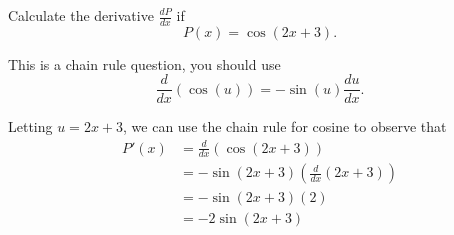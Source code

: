 \documentclass{ximera}
\author{Emma Smith Zbarsky}
\begin{document}
\begin{exercise}

Calculate the derivative $\frac{dP}{dx}$ if \[P(x) = \cos(2x+3).\]


\begin{hint}
This is a chain rule question, you should use
\[\frac{d}{dx}\left(\cos(u)\right) = -\sin(u)\frac{du}{dx}.\]
\end{hint}


\begin{hint}
Letting $u = 2x+3$, we can use the chain rule for cosine to observe that
\begin{align*}
P'(x) &= \frac{d}{dx}\left(\cos(2x+3)\right) \\
&= -\sin(2x+3)\left(\frac{d}{dx}\left(2x+3\right)\right) \\
&= -\sin(2x+3)(2) \\
&= \boxed{-2\sin(2x+3)}\end{align*}
\end{hint}


\begin{multipleChoice}
\end{multipleChoice}

\end{exercise}
\end{document}
